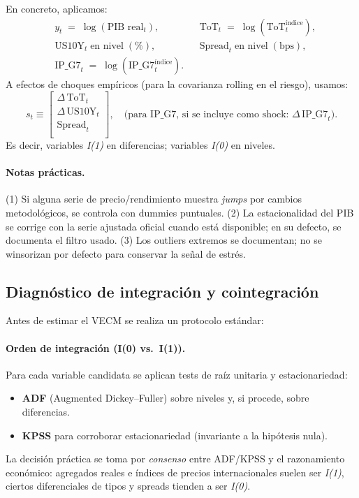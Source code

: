 \documentclass[11pt,a4paper]{article}
\newcommand{\1}{\mathbf{1}}
\begin{document}
En concreto, aplicamos:
\[
\begin{aligned}
& y_t \;=\; \log(\text{PIB real}_t), \qquad 
&& \text{ToT}_t \;=\; \log(\text{ToT}_t^{\text{índice}}), \\
& \text{US10Y}_t \;\text{en nivel} \;(\%), \qquad
&& \text{Spread}_t \;\text{en nivel} \;(\text{bps}), \\
& \text{IP\_G7}_t \;=\; \log(\text{IP\_G7}_t^{\text{índice}}).
\end{aligned}
\]
A efectos de choques empíricos (para la covarianza rolling en el riesgo), usamos:
\[
s_t \equiv 
\begin{bmatrix}
\Delta\,\text{ToT}_t \\
\Delta\,\text{US10Y}_t \\
\text{Spread}_t \\
\end{bmatrix},
\quad\text{(para IP\_G7, si se incluye como shock: }\Delta\,\text{IP\_G7}_t\text{).}
\]
Es decir, variables \emph{I(1)} en diferencias; variables \emph{I(0)} en niveles.

\paragraph{Notas prácticas.}
(1) Si alguna serie de precio/rendimiento muestra \emph{jumps} por cambios metodológicos, se controla con dummies puntuales. 
(2) La estacionalidad del PIB se corrige con la serie ajustada oficial cuando está disponible; en su defecto, se documenta el filtro usado.
(3) Los outliers extremos se documentan; no se winsorizan por defecto para conservar la señal de estrés.

\subsection{Diagnóstico de integración y cointegración}

Antes de estimar el VECM se realiza un protocolo estándar:

\paragraph{Orden de integración (I(0) vs.\ I(1)).}
Para cada variable candidata se aplican tests de raíz unitaria y estacionariedad:
\begin{itemize}
  \item \textbf{ADF} (Augmented Dickey--Fuller) sobre niveles y, si procede, sobre diferencias.
  \item \textbf{KPSS} para corroborar estacionariedad (invariante a la hipótesis nula).
\end{itemize}
La decisión práctica se toma por \emph{consenso} entre ADF/KPSS y el razonamiento económico: agregados reales e índices de precios internacionales suelen ser \emph{I(1)}, ciertos diferenciales de tipos y spreads tienden a ser \emph{I(0)}.
\end{document}
